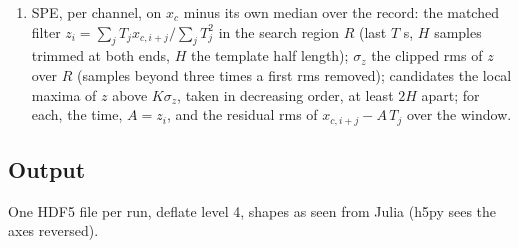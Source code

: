 \documentclass[11pt]{article}
\newcommand{\code}[1]{\texttt{#1}}
\newcommand{\us}{\textmu s}
\begin{document}
\begin{enumerate}
  window (flag \code{ctrl\_ok}). Flags: \code{short} when the charge
  window starts before the record or its after-window ends after it (the
  SHORT class of \code{offline.py}); \code{room\_before} when the full
  pre-window is in the record, \code{room\_after} when the after-window
  is; \code{nb\_used} $= n_b'$.
  With \code{end}: $B_c$ = median of $y_c$ over the last $N$ samples, and
  the control window of \code{selection\_doc.tex} step~8. $t_c$ = time of
  the maximum of the moving average (width $N_{\rm sm}$) of $y_c - B_c$
  inside the window.
\item SPE, per channel, on $x_c$ minus its own median over the record: the
  matched filter $z_i = \sum_j T_j x_{c,i+j} / \sum_j T_j^2$ in the search
  region $R$ (last $T$ \us{}, $H$ samples trimmed at both ends, $H$ the
  template half length); $\sigma_z$ the clipped rms of $z$ over $R$
  (samples beyond three times a first rms removed); candidates the local
  maxima of $z$ above $K\sigma_z$, taken in decreasing order, at least
  $2H$ apart; for each, the time, $A = z_i$, and the residual rms of
  $x_{c,i+j} - A\,T_j$ over the window.
\end{enumerate}

\subsection{Output}

One HDF5 file per run, deflate level 4, shapes as seen from Julia (h5py
sees the axes reversed).
\end{document}
